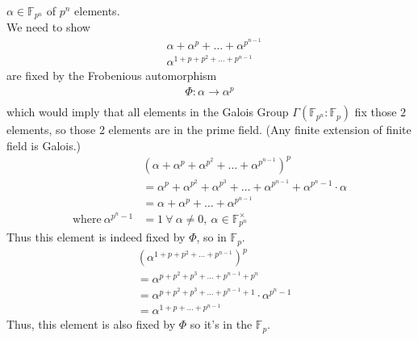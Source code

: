 \documentclass{article}
\begin{document}
\begin{homeworkProblem}
    $\alpha \in \mathbb{F}_{p^n}$ of $p^n$ elements.\\
    We need to show 
    \begin{align}
        &\alpha + \alpha^p + \ldots + \alpha^{p^{n-1}}\\
        &\alpha^{1 + p + p^2 + \ldots + p^{n-1}}
    \end{align}
    are fixed by the Frobenious automorphism
    \begin{align}
        \Phi: \alpha \xrightarrow[]{} \alpha^p
    \end{align}
    which would imply that all elements in the Galois Group
    $\Gamma(\mathbb{F}_{p^n} : \mathbb{F}_p)$ fix those $2$ elements, so
    those 2 elements are in the prime field.
    (Any finite extension of finite field is Galois.)
    \begin{align}
        &\left( \alpha + \alpha^p + \alpha^{p^{2}} + \ldots + \alpha^{p^{n-1}} \right)^p\\
        &= \alpha^p + \alpha^{p^2} + \alpha^{p^3} + \ldots + \alpha^{p^{n-1}} + \alpha^{p^{n}-1} \cdot \alpha \\
        &= \alpha + \alpha^p + \ldots + \alpha^{p^{n-1}} \\
        \text{where} \ \alpha^{p^n - 1} &= 1 \ \forall \ \alpha \neq 0, \ \alpha \in \mathbb{F}_{p^n}^{\times}
    \end{align}
    Thus this element is indeed fixed by $\Phi$, so in $\mathbb{F}_p$.
    \begin{align}
        &\left( \alpha^{1 + p + p^2 + \ldots + p^{n-1}} \right)^p\\
        &= \alpha^{p+p^2 + p^3 + \ldots + p^{n-1} + p^n}\\
        &= \alpha^{p + p^2 + p^3 + \ldots + p^{n-1} + 1} \cdot \alpha^{p^n - 1}\\
        &= \alpha^{1 + p + \ldots + p^{n-1}}
    \end{align}
    Thus, this element is also fixed by $\Phi$ so it's in the $\mathbb{F}_p$.
    
    
    
    
    
\end{homeworkProblem}
\end{document}
